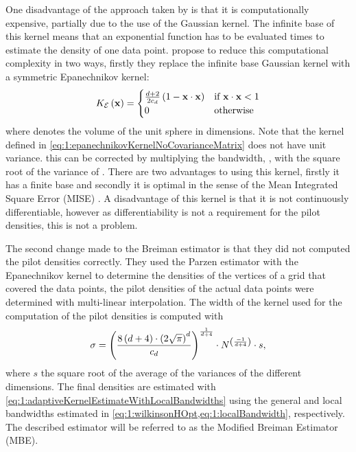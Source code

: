 	One disadvantage of the approach taken by \citeauthor{breiman1977variable} is that it is computationally expensive, partially due to the use of the Gaussian kernel. The infinite base of this kernel means that an exponential function has to be evaluated \varNumPatterns times to estimate the density of one data point. 
	\textcite{wilkinson1995dataplot} propose to reduce this computational complexity in two ways, firstly they replace the infinite base Gaussian kernel with a symmetric Epanechnikov kernel:
	\begin{equation}\label{eq:1:epanechnikovKernelNoCovarianceMatrix}
		\varKernel[\varEpan]{\varPattern} = 
		\begin{cases}
			\frac{\varDim + 2}{2\varUnitSphere{\varDim}} \left( 1 - \varPattern \cdot \varPattern \right) & \text{if } \varPattern \cdot \varPattern < 1\\
			0 & \text{otherwise}
		\end{cases}
	\end{equation}
	where \varUnitSphere{\varDim} denotes the volume of the unit sphere in \varDim dimensions. Note that the kernel defined in \cref{eq:1:epanechnikovKernelNoCovarianceMatrix} does not have unit variance. this can be corrected by multiplying the bandwidth, \varBandwidth,  with the square root of the variance of \varKernel[\varEpan]{\cdot}. There are two advantages to using this kernel, firstly it has a finite base and secondly it is optimal in the sense of the Mean Integrated Square Error (MISE) \cite{epanechnikov1969non}. A disadvantage of this kernel is that it is not continuously differentiable, however as differentiability is not a requirement for the pilot densities, this is not a problem.

	The second change \textcite{wilkinson1995dataplot} made to the Breiman estimator is that they did not computed the pilot densities correctly. They used the Parzen estimator with the Epanechnikov kernel to determine the densities of the vertices of a grid that covered the data points, the pilot densities of the actual data points were determined with multi-linear interpolation. 
	The width of the kernel used for the computation of the pilot densities is computed with
		\begin{equation}\label{eq:1:wilkinsonHOpt}
			\sigma = \left(\frac{8\left(d + 4\right) \cdot \left(2 \sqrt{\pi}\right)^d}{c_{d}}\right)^{\frac{1}{d + 4}}\cdot N^{\left(\frac{-1}{d +  4}\right)} \cdot s,
		\end{equation}
	where $s$ the square root of the average of the variances of the different dimensions. The final densities are estimated with \cref{eq:1:adaptiveKernelEstimateWithLocalBandwidths} using the general and local bandwidths estimated in \cref{eq:1:wilkinsonHOpt,eq:1:localBandwidth}, respectively. The described estimator will be referred to as the Modified Breiman Estimator (MBE). 

